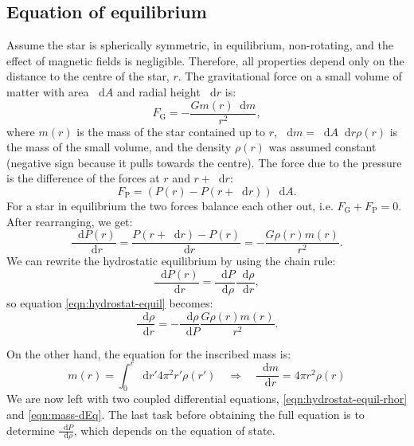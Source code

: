 \documentclass[]{article}
\newcommand{\dd}{\mathop{}\!\mathrm{d}}
\begin{document}
\subsection{Equation of equilibrium}\label{subsec:test}
	Assume the star is spherically symmetric, in equilibrium, non-rotating, and the effect of magnetic fields is negligible. Therefore, all properties depend only on the distance to the centre of the star, $r$. The gravitational force on a small volume of matter with area $\dd A$ and radial height $\dd r$ is:
	\begin{equation}
		F_\mathrm{G} = - \frac{G m\left(r\right) \dd m}{r^2},
	\end{equation}
	where $m\left(r\right)$ is the mass of the star contained up to $r$, $\dd m = \dd A \dd r \rho \left(r\right)$ is the mass of the small volume, and the density $\rho \left(r\right)$ was assumed constant (negative sign because it pulls towards the centre). The force due to the pressure is the difference of the forces at $r$ and $r + \dd r$:
	\begin{equation}
	F_\mathrm{P} = \left( P\left(r\right) - P\left(r + \dd r\right)\right) \dd A.
	\end{equation}
	For a star in equilibrium the two forces balance each other out, i.e. $F_\mathrm{G} + F_\mathrm{P} = 0$. After rearranging, we get:
	\begin{equation} \label{eqn:hydrostat-equil}
		\frac{\dd P(r)}{\dd r} = \frac{P\left(r + \dd r\right) - P\left(r\right)}{\dd r} = - \frac{G \rho(r) m(r)}{r^2}.
	\end{equation}
	We can rewrite the hydrostatic equilibrium by using the chain rule:
	\begin{equation}
		\frac{\dd P(r)}{\dd r} = \frac{\dd P}{\dd \rho} \frac{\dd \rho}{\dd r},
	\end{equation}
	so equation \eqref{eqn:hydrostat-equil} becomes:
	\begin{equation}\label{eqn:hydrostat-equil-rhor}
		\frac{\dd \rho}{\dd r} = - \frac{\dd \rho}{\dd P} \frac{G \rho(r) m(r)}{r^2}.
	\end{equation}

	On the other hand, the equation for the inscribed mass is:
	\begin{equation}\label{eqn:mass-dEq}
		m(r) = \int_0^r \dd r' 4 \pi^2 r' \rho\left(r'\right) \quad \Rightarrow \quad \frac{\dd m}{\dd r} = 4 \pi r^2 \rho(r)
	\end{equation}
	We are now left with two coupled differential equations, \eqref{eqn:hydrostat-equil-rhor} and \eqref{eqn:mass-dEq}. The last task before obtaining the full equation is to determine $\frac{\dd P}{\dd \rho}$, which depends on the equation of state.
\end{document}
